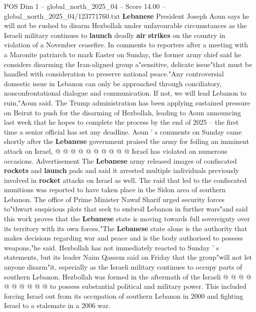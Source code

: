 \begin{textsample}{POS Dim 1 – global\_north\_2025\_04 – Score 14.00 – global\_north\_2025\_04/123771760.txt}  \label{ex:f1_pos_415}
\textbf{Lebanese} President Joseph Aoun says he will not be rushed to disarm Hezbollah under unfavourable circumstances as the Israeli military continues to \textbf{launch} deadly \textbf{air} \textbf{strikes} on the country in violation of a November ceasefire.
In comments to reporters after a meeting with a Maronite patriarch to mark Easter on Sunday, the former army chief said he considers disarming the Iran-aligned group a"sensitive, delicate issue"that must be handled with consideration to preserve national peace."Any controversial domestic issue in Lebanon can only be approached through conciliatory, nonconfrontational dialogue and communication.
If not, we will lead Lebanon to ruin,"Aoun said.
The Trump administration has been applying sustained pressure on Beirut to push for the disarming of Hezbollah, leading to Aoun announcing last week that he hopes to complete the process by the end of 2025 -- the first time a senior official has set any deadline.
Aoun ' s comments on Sunday came shortly after the \textbf{Lebanese} government praised the army for foiling an imminent attack on Israel, @ @ @ @ @ @ @ @ @ @ Israel has violated on numerous occasions.
Advertisement The \textbf{Lebanese} army released images of confiscated \textbf{rockets} and \textbf{launch} pads and said it arrested multiple individuals previously involved in \textbf{rocket} attacks on Israel as well.
The raid that led to the confiscated munitions was reported to have taken place in the Sidon area of southern Lebanon.
The office of Prime Minister Nawaf Sharif urged security forces to"thwart suspicious plots that seek to embroil Lebanon in further wars"and said this work proves that the \textbf{Lebanese} state is moving towards full sovereignty over its territory with its own forces."The \textbf{Lebanese} state alone is the authority that makes decisions regarding war and peace and is the body authorised to possess weapons,"he said.
Hezbollah has not immediately reacted to Sunday ' s statements, but its leader Naim Qassem said on Friday that the group"will not let anyone disarm"it, especially as the Israeli military continues to occupy parts of southern Lebanon.
Hezbollah was formed in the aftermath of the Israeli @ @ @ @ @ @ @ @ @ @ to possess substantial political and military power.
This included forcing Israel out from its occupation of southern Lebanon in 2000 and fighting Israel to a stalemate in a 2006 war.

\end{textsample}
